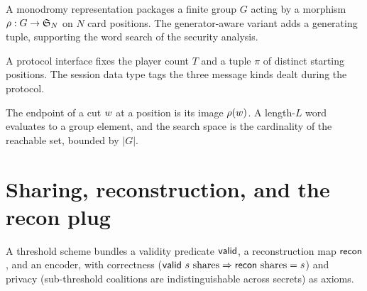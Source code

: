 \begin{definition}
  \label{def:monodromy_repr}
  \rocqok
  A monodromy representation packages a finite group $G$ acting by a morphism
  $\rho : G \to \mathfrak{S}_N$ on $N$ card positions. The generator-aware
  variant adds a generating tuple, supporting the word search of the security
  analysis.
\end{definition}

\begin{definition}
  \label{def:pgg_interface}
  \rocqok
  A protocol interface fixes the player count $T$ and a tuple $\pi$ of distinct
  starting positions. The session data type tags the three message kinds dealt
  during the protocol.
\end{definition}

\begin{definition}
  \label{def:endpoint}
  \rocqok
  The endpoint of a cut $w$ at a position is its image $\rho(w)$.
  A length-$L$ word evaluates to a group element, and the search space is the
  cardinality of the reachable set, bounded by $|G|$.
\end{definition}

\chapter{Sharing, reconstruction, and the recon plug}

\begin{definition}
  \label{def:threshold_scheme}
  \rocqok
  A threshold scheme bundles a validity predicate $\mathsf{valid}$, a reconstruction map
  $\mathsf{recon}$, and an encoder, with correctness ($\mathsf{valid}~s~\text{shares}
  \Rightarrow \mathsf{recon}~\text{shares}=s$) and privacy (sub-threshold
  coalitions are indistinguishable across secrets) as axioms.
\end{definition}

